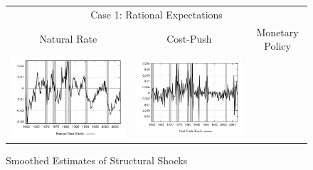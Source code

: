 \begin{figure}
\caption{Smoothed Estimates of Structural Shocks}\label{fg:shocks}
\vspace*{1pc}\hspace*{-0.2in}
\begin{tabular}{ccc}
\multicolumn{3}{c}{Case 1: Rational Expectations} \\ 
Natural Rate & Cost-Push & Monetary Policy \\
\includegraphics[scale=0.3]{results_re/natrateshock.png} & 
\includegraphics[scale=0.3]{results_re/costpushshock.png} & 

\end{tabular}
\end{figure}
